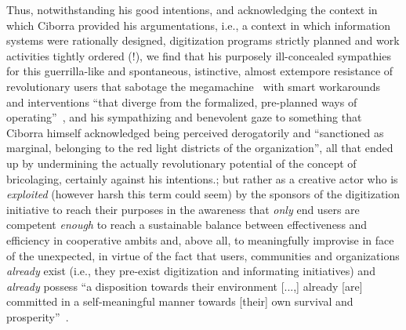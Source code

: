 \documentclass{article}
\begin{document}
{Thus, notwithstanding his good intentions, and acknowledging the context in which Ciborra provided his argumentations, i.e., a context in which information systems were rationally designed, digitization programs strictly planned and work activities tightly ordered (!), we find that his purposely ill-concealed sympathies for this guerrilla-like and spontaneous, istinctive, almost extempore resistance of revolutionary users that sabotage the megamachine~\citep{latouche_megamachine_2004} with smart workarounds and interventions ``that diverge from the formalized, pre-planned ways of operating''~\citep{ciborra_labyrinths_2002}, and his sympathizing and benevolent gaze to something that Ciborra himself acknowledged being perceived derogatorily and ``sanctioned as marginal, belonging to the red light districts of the organization'', all that ended up by undermining the actually revolutionary potential of the concept of bricolaging, certainly against his intentions.}; but rather as a creative actor who is \emph{exploited} (however harsh this term could seem) by the sponsors of the digitization initiative to reach their purposes in the awareness that \emph{only} end users are competent \emph{enough} to reach a sustainable balance between effectiveness and efficiency in cooperative ambits and, above all, to meaningfully improvise in face of the unexpected, in virtue of the fact that users, communities and organizations \emph{already} exist (i.e., they pre-exist digitization and informating initiatives) and \emph{already} possess ``a disposition towards their environment [...,] already [are] committed in a self-meaningful manner towards [their] own survival and prosperity''~\citep{angell_dispositioning_2009}. 
\end{document}
